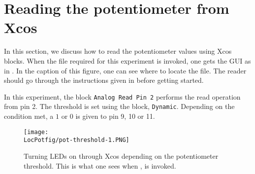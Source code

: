\section{Reading the potentiometer from Xcos}
In this section, we discuss how to read the potentiometer values using
Xcos blocks. When the file required for this experiment is invoked, one
gets the GUI as in .  In the caption of this
figure, one can see where to locate the file.  The reader should go
through the instructions given in  before
getting started.

In this experiment, the block {\tt Analog Read Pin 2} performs the read 
operation from pin 2. The threshold is set using the block, {\tt Dynamic}. 
Depending on the condition met, a $1$ or $0$ is given to pin 9, 10 or 11.

\begin{figure}
  \centering
  \texttt{[image: \\LocPotfig/pot-threshold-1.PNG]}
  \caption[Turning LEDs on through Xcos depending on the potentiometer
  threshold]{Turning LEDs on through Xcos depending on the
    potentiometer threshold.  This is what one sees when
      , is invoked.}
  \label{fig:pot-threshold}
\end{figure}


